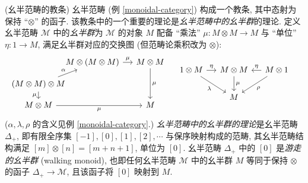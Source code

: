 \begin{example}
	[label={doctrine-monoidal-categories}]
	{(幺半范畴的教条)}
	幺半范畴 (例 \ref{monoidal-category}) 构成一个教条, 其中态射为保持 ``$\otimes$'' 的函子.
	该教条中的一个重要的理论是\emph{幺半范畴中的幺半群}的理论. 定义幺半范畴 $\mathcal M$ 中的\emph{幺半群}为 $\mathcal M$ 的对象 $M$ 配备 ``乘法'' $\mu\colon M\otimes M \to M$ 与 ``单位'' $\eta\colon 1\to M$, 满足幺半群对应的交换图 (但范畴论乘积改为 $\otimes$):
	\[\begin{tikzcd}[ampersand replacement=\&,sep=small]
		\& {\hspace{-1em}M\otimes (M\otimes M)} \& {M\otimes M} \\
		{\hspace{-1em}(M\otimes M)\otimes M\hspace{-1em}} \\
		{M\otimes M} \&\& M
		\arrow["\mu", from=1-2, to=1-3]
		\arrow["\mu", from=1-3, to=3-3]
		\arrow["\alpha", from=2-1, to=1-2]
		\arrow["\mu"', from=2-1, to=3-1]
		\arrow["\mu"', from=3-1, to=3-3]
	\end{tikzcd}
	\quad
	\begin{tikzcd}[ampersand replacement=\&,column sep=small]
		{1\otimes M} \& {M\otimes M} \& {M\otimes 1} \\
		\& M
		\arrow["\eta", from=1-1, to=1-2]
		\arrow["\lambda"', from=1-1, to=2-2]
		\arrow["\mu", from=1-2, to=2-2]
		\arrow["\eta"', from=1-3, to=1-2]
		\arrow["\rho", from=1-3, to=2-2]
	\end{tikzcd}\]
	($\alpha, \lambda, \rho$ 的含义见例 \ref{monoidal-category}.)
	\emph{幺半范畴中的幺半群的理论}是幺半范畴 $\Delta_+$, 即有限全序集 $[-1],[0],[1],[2],\cdots$ 与保序映射构成的范畴, 其幺半范畴结构满足 $[m]\otimes [n] = [m+n+1]$, 单位为 $[0]$. 幺半范畴 $\Delta_+$ 中的 $[0]$ 是\emph{游走的幺半群} (walking monoid), 也即任何幺半范畴 $\mathcal M$ 中的幺半群 $M$ 等同于保持 $\otimes$ 的函子 $\Delta_+ \to \mathcal M$, 且该函子将 $[0]$ 映射到 $M$.
\end{example}

